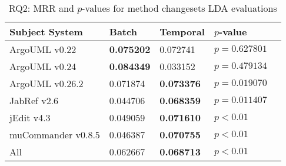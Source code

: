 
\begin{table}[t]
\renewcommand{\arraystretch}{1.3}
\footnotesize
\centering
\caption{RQ2: MRR and $p$-values for method changesets LDA evaluations}
\begin{tabular}{l|ll|ll}
   \toprule
    Subject System & Batch           & Temporal        & $p$-value      \\
    \midrule

ArgoUML v0.22      & {\bf 0.075202 } & 0.072741        & $p = 0.627801$ \\
ArgoUML v0.24      & {\bf 0.084349 } & 0.033152        & $p = 0.479134$ \\
ArgoUML v0.26.2    & 0.071874        & {\bf 0.073376 } & $p = 0.019070$ \\
JabRef v2.6        & 0.044706        & {\bf 0.068359 } & $p = 0.011407$ \\
jEdit v4.3         & 0.049059        & {\bf 0.071610 } & $p < 0.01$     \\
muCommander v0.8.5 & 0.046387        & {\bf 0.070755 } & $p < 0.01$     \\
\midrule
All                & 0.062667        & {\bf 0.068713 } & $p < 0.01$     \\

    \bottomrule
\end{tabular}
\label{table:rq2:method:lda}
\end{table}

